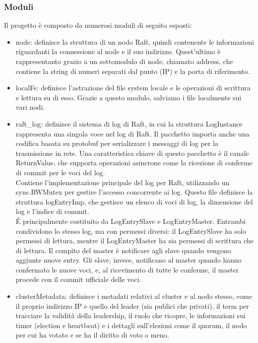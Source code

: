 \subsubsection{Moduli}
Il progetto è composto da numerosi moduli di seguito esposti:
\begin{itemize}
  \item node: definisce la struttura di un nodo Raft, quindi contenente le informazioni riguardanti la connessione al node e il suo indirizzo. Quest'ultimo è rappresentanto grazio a un sottomodulo di node, chiamato address, 
    che contiene la string di numeri separati dal punto (IP) e la porta di riferimento.

  \item localFs: definisce l'astrazione del file system locale e le operazioni di scrittura e lettura su di esso. Grazie a questo modulo, salviamo i file localmente sui vari nodi.
 
  \item raft\_log: definisce il sistema di log di Raft, in cui la struttura LogInstance rappresenta una singola voce nel log di Raft. Il pacchetto importa anche una codifica basata su protobuf per serializzare i messaggi 
    di log per la trasmissione in rete. Una caratteristica chiave di questo pacchetto è il canale ReturnValue, che supporta operazioni asincrone come la ricezione di conferme di commit per le voci del log. \\
    Contiene l'implementazione principale del log per Raft, utilizzando un sync.RWMutex per gestire l'accesso concorrente ai log. Questo file definisce la struttura logEntryImp, che gestisce un elenco di voci di log, la 
    dimensione del log e l'indice di commit. \\
    \'E principalmente costituito da LogEntrySlave e LogEntryMaster. Entrambi condividono lo stesso log, ma con permessi diversi: il LogEntrySlave ha solo permessi di lettura, mentre il LogEntryMaster ha sia permessi di scrittura 
    che di lettura. Il compito del master è notificare agli slave quando vengono aggiunte nuove entry. Gli slave, invece, notificano al master quando hanno confermato le nuove voci, e, al ricevimento di tutte le conferme, 
    il master procede con il commit ufficiale delle voci.
  
  \item clusterMetadata: definisce i metadati relativi al cluster e al nodo stesso, come il proprio indirizzo IP e quello del leader (sia publici che privati), il term per tracciare la validità della leadership, il ruolo 
    che ricopre, le informazioni sui timer (election e heartbeat) e i dettagli 
    sull'elezioni come il quorum, il nodo per cui ha votato e se ha il diritto di voto o meno, 


\end{itemize}
